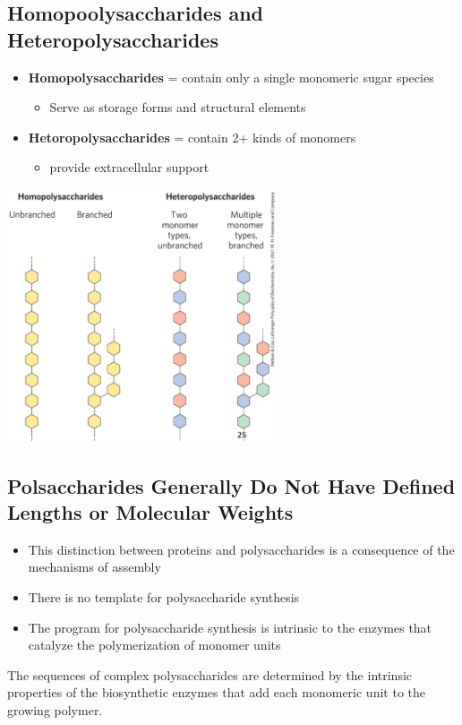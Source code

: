 \documentclass[10pt]{article}
\begin{document}
\subsection*{Homopoolysaccharides and Heteropolysaccharides}
\begin{itemize}
    \item \textbf{Homopolysaccharides} = contain only a single monomeric sugar species
    \begin{itemize}
        \item Serve as storage forms and structural elements
    \end{itemize}
    \item \textbf{Hetoropolysaccharides} = contain 2+ kinds of monomers
    \begin{itemize}
        \item provide extracellular support
    \end{itemize}
\end{itemize}
\begin{center}
    \includegraphics*[width=0.6\textwidth]{L1_16.png}
\end{center}

\subsection*{Polsaccharides Generally Do Not Have Defined Lengths or Molecular Weights}
\begin{itemize}
    \item This distinction between proteins and polysaccharides is a consequence of the mechanisms of assembly
    \item There is no template for polysaccharide synthesis
    \item The program for polysaccharide synthesis is intrinsic to the enzymes that catalyze the polymerization of monomer units
\end{itemize}
The sequences of complex polysaccharides are determined by the intrinsic properties of the biosynthetic enzymes that add each monomeric unit to the growing polymer.
\end{document}
